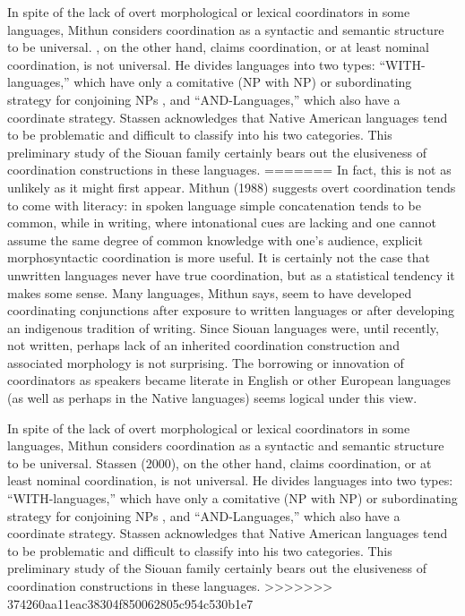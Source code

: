 \documentclass[output=paper]{LSP/langsci}
\begin{document}
In spite of the lack of overt morphological or lexical coordinators in some languages, Mithun considers coordination as a syntactic and semantic structure to be universal. \citet{Stassen2000}, on the other hand, claims coordination, or at least nominal coordination, is not universal. He divides languages into two types: ``WITH-languages,'' which have only a comitative (NP with NP) or subordinating strategy for conjoining NPs , and ``AND-Languages,'' which also have a coordinate strategy. Stassen acknowledges that Native American languages tend to be problematic and difficult to classify into his two categories. This preliminary study of the Siouan family certainly bears out the elusiveness of coordination constructions in these languages.
=======
In fact, this is not as unlikely as it might first appear. Mithun (1988) suggests overt coordination tends to come with literacy: in spoken language simple concatenation tends to be common, while in writing, where intonational cues are lacking and one cannot assume the same degree of common knowledge with one's audience, explicit morphosyntactic coordination is more useful. It is certainly not the case that unwritten languages never have true coordination, but as a statistical tendency it makes some sense. Many languages, Mithun says, seem to have developed coordinating conjunctions after exposure to written languages or after developing an indigenous tradition of writing. Since Siouan languages were, until recently, not written, perhaps lack of an inherited coordination construction and associated morphology is not surprising. The borrowing or innovation of coordinators as speakers became literate in English or other European languages (as well as perhaps in the Native languages) seems logical under this view.

In spite of the lack of overt morphological or lexical coordinators in some languages, Mithun considers coordination as a syntactic and semantic structure to be universal. Stassen (2000), on the other hand, claims coordination, or at least nominal coordination, is not universal. He divides languages into two types: ``WITH-languages,'' which have only a comitative (NP with NP) or subordinating strategy for conjoining NPs , and ``AND-Languages,'' which also have a coordinate strategy. Stassen acknowledges that Native American languages tend to be problematic and difficult to classify into his two categories. This preliminary study of the Siouan family certainly bears out the elusiveness of coordination constructions in these languages.
>>>>>>> 374260aa11eac38304f850062805c954c530b1e7
\end{document}
